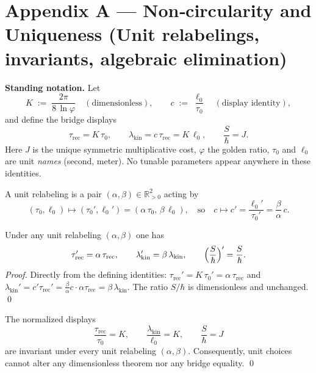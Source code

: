 \documentclass[11pt]{article}
\begin{document}

\section*{Appendix A — Non‑circularity and Uniqueness (Unit relabelings, invariants, algebraic elimination)}

\noindent\textbf{Standing notation.}
Let
\[
K\;:=\;\frac{2\pi}{8\,\ln\varphi}\quad(\text{dimensionless}),\qquad
c\;:=\;\frac{\ell_{0}}{\tau_{0}}\quad(\text{display identity}),
\]
and define the bridge displays
\[
\tau_{\mathrm{rec}}=K\,\tau_{0},\qquad
\lambda_{\mathrm{kin}}=c\,\tau_{\mathrm{rec}}=K\,\ell_{0},\qquad
\frac{S}{\hbar}=J.
\]
Here $J$ is the unique symmetric multiplicative cost, $\varphi$ the golden ratio, $\tau_{0}$ and $\ell_{0}$ are unit \emph{names} (second, meter). No tunable parameters appear anywhere in these identities.  %

\begin{definition}
A unit relabeling is a pair $(\alpha,\beta)\in\mathbb{R}_{>0}^{2}$ acting by
\[
(\tau_{0},\ell_{0})\mapsto(\tau_{0}',\ell_{0}')=(\alpha\,\tau_{0},\,\beta\,\ell_{0}),
\quad\text{so}\quad
c\mapsto c'=\frac{\ell_{0}'}{\tau_{0}'}=\frac{\beta}{\alpha}\,c.
\]
\end{definition}

\begin{lemma}
Under any unit relabeling $(\alpha,\beta)$ one has
\[
\tau_{\mathrm{rec}}'=\alpha\,\tau_{\mathrm{rec}},\qquad
\lambda_{\mathrm{kin}}'=\beta\,\lambda_{\mathrm{kin}},\qquad
\Bigl(\frac{S}{\hbar}\Bigr)'=\frac{S}{\hbar}.
\]
\emph{Proof.} Directly from the defining identities:
$\tau_{\mathrm{rec}}'=K\,\tau_{0}'=\alpha\,\tau_{\mathrm{rec}}$ and
$\lambda_{\mathrm{kin}}'=c'\tau_{\mathrm{rec}}'=\frac{\beta}{\alpha}c\cdot\alpha\tau_{\mathrm{rec}}=\beta\,\lambda_{\mathrm{kin}}$.
The ratio $S/\hbar$ is dimensionless and unchanged. \qed
\end{lemma}

\begin{theorem}
The normalized displays
\[
\boxed{\ \frac{\tau_{\mathrm{rec}}}{\tau_{0}}=K,\qquad
        \frac{\lambda_{\mathrm{kin}}}{\ell_{0}}=K,\qquad
        \frac{S}{\hbar}=J\ }
\]
are invariant under every unit relabeling $(\alpha,\beta)$.
Consequently, unit choices cannot alter any dimensionless theorem nor any bridge equality. \qed
\end{theorem}
\end{document}
